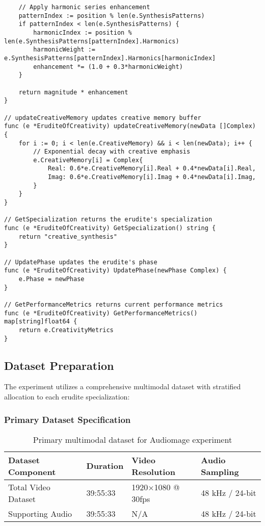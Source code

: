\begin{tcolorbox}[colback=CodeBackground, colframe=DarkGray, title=Erudite of Creativity Implementation, fonttitle=\bfseries]
\begin{verbatim}
    // Apply harmonic series enhancement
    patternIndex := position % len(e.SynthesisPatterns)
    if patternIndex < len(e.SynthesisPatterns) {
        harmonicIndex := position % len(e.SynthesisPatterns[patternIndex].Harmonics)
        harmonicWeight := e.SynthesisPatterns[patternIndex].Harmonics[harmonicIndex]
        enhancement *= (1.0 + 0.3*harmonicWeight)
    }
    
    return magnitude * enhancement
}

// updateCreativeMemory updates creative memory buffer
func (e *EruditeOfCreativity) updateCreativeMemory(newData []Complex) {
    for i := 0; i < len(e.CreativeMemory) && i < len(newData); i++ {
        // Exponential decay with creative emphasis
        e.CreativeMemory[i] = Complex{
            Real: 0.6*e.CreativeMemory[i].Real + 0.4*newData[i].Real,
            Imag: 0.6*e.CreativeMemory[i].Imag + 0.4*newData[i].Imag,
        }
    }
}

// GetSpecialization returns the erudite's specialization
func (e *EruditeOfCreativity) GetSpecialization() string {
    return "creative_synthesis"
}

// UpdatePhase updates the erudite's phase
func (e *EruditeOfCreativity) UpdatePhase(newPhase Complex) {
    e.Phase = newPhase
}

// GetPerformanceMetrics returns current performance metrics
func (e *EruditeOfCreativity) GetPerformanceMetrics() map[string]float64 {
    return e.CreativityMetrics
}
\end{verbatim}
\end{tcolorbox}

\subsection{Dataset Preparation}

The experiment utilizes a comprehensive multimodal dataset with stratified allocation to each erudite specialization:

\subsubsection{Primary Dataset Specification}

\begin{table}[h]
\centering
\begin{tabular}{|l|l|l|l|}
\hline
\textbf{Dataset Component} & \textbf{Duration} & \textbf{Video Resolution} & \textbf{Audio Sampling} \\
\hline
Total Video Dataset & 39:55:33 & 1920×1080 @ 30fps & 48 kHz / 24-bit \\
\hline
Supporting Audio & 39:55:33 & N/A & 48 kHz / 24-bit \\
\hline
\end{tabular}
\caption{Primary multimodal dataset for Audiomage experiment}
\end{table}

